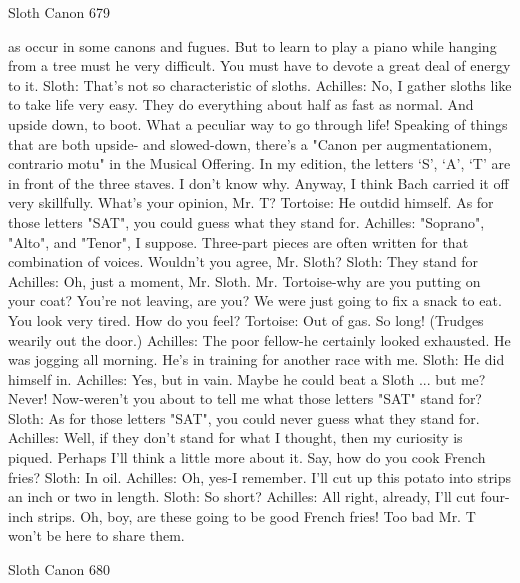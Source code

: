 Sloth Canon                                                                      679

   as occur in some canons and fugues. But to learn to play a piano while hanging from a
   tree must he very difficult. You must have to devote a great deal of energy to it.
Sloth: That's not so characteristic of sloths.
Achilles: No, I gather sloths like to take life very easy. They do everything about half as
   fast as normal. And upside down, to boot. What a peculiar way to go through life!
   Speaking of things that are both upside- and slowed-down, there's a "Canon per
   augmentationem, contrario motu" in the Musical Offering. In my edition, the letters
   `S', `A', `T' are in front of the three staves. I don't know why. Anyway, I think Bach
   carried it off very skillfully. What's your opinion, Mr. T?
Tortoise: He outdid himself. As for those letters "SAT", you could guess what they stand
   for.
Achilles: "Soprano", "Alto", and "Tenor", I suppose. Three-part pieces are often written
   for that combination of voices. Wouldn't you agree, Mr. Sloth?
Sloth: They stand for
Achilles: Oh, just a moment, Mr. Sloth. Mr. Tortoise-why are you putting on your coat?
   You're not leaving, are you? We were just going to fix a snack to eat. You look very
   tired. How do you feel?
Tortoise: Out of gas. So long! (Trudges wearily out the door.)
Achilles: The poor fellow-he certainly looked exhausted. He was jogging all morning.
   He's in training for another race with me. Sloth: He did himself in.
Achilles: Yes, but in vain. Maybe he could beat a Sloth ... but me? Never! Now-weren't
   you about to tell me what those letters "SAT" stand for? Sloth: As for those letters
   "SAT", you could never guess what they stand for.
Achilles: Well, if they don't stand for what I thought, then my curiosity is piqued.
   Perhaps I'll think a little more about it. Say, how do you cook French fries? Sloth: In
   oil.
Achilles: Oh, yes-I remember. I'll cut up this potato into strips an inch or two in length.
Sloth: So short?
Achilles: All right, already, I'll cut four-inch strips. Oh, boy, are these going to be good
   French fries! Too bad Mr. T won't be here to share them.




Sloth Canon                                                                             680

